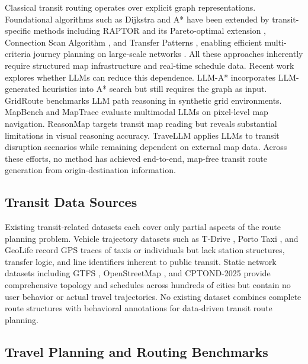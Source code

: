 \documentclass{llmxive}
\begin{document}
Classical transit routing operates over explicit graph representations. Foundational algorithms such as Dijkstra \cite{dijkstra2022note} and A* \cite{hart1968formal} have been extended by transit-specific methods including RAPTOR \cite{delling2015round} and its Pareto-optimal extension \cite{delling2019fast}, Connection Scan Algorithm \cite{dibbelt2018csa}, and Transfer Patterns \cite{bast2010transfer}, enabling efficient multi-criteria journey planning on large-scale networks \cite{bast2016route}. All these approaches inherently require structured map infrastructure and real-time schedule data. Recent work explores whether LLMs can reduce this dependence. LLM-A* \cite{meng2024llmastar} incorporates LLM-generated heuristics into A* search but still requires the graph as input. GridRoute \cite{lin2025gridroute} benchmarks LLM path reasoning in synthetic grid environments. MapBench \cite{xing2025mapbench} and MapTrace \cite{chen2025maptrace} evaluate multimodal LLMs on pixel-level map navigation. ReasonMap \cite{feng2025can} targets transit map reading but reveals substantial limitations in visual reasoning accuracy. TraveLLM \cite{fang2025travellm} applies LLMs to transit disruption scenarios while remaining dependent on external map data. Across these efforts, no method has achieved end-to-end, map-free transit route generation from origin-destination information.

\subsection{Transit Data Sources}

Existing transit-related datasets each cover only partial aspects of the route planning problem. Vehicle trajectory datasets such as T-Drive \cite{yuan2010tdrive}, Porto Taxi \cite{moreira2013porto}, and GeoLife \cite{zheng2010geolife} record GPS traces of taxis or individuals \cite{zheng2015trajectory} but lack station structures, transfer logic, and line identifiers inherent to public transit. Static network datasets including GTFS \cite{wong2013leveraging}, OpenStreetMap \cite{haklay2008openstreetmap}, and CPTOND-2025 \cite{wang2026china} provide comprehensive topology and schedules across hundreds of cities but contain no user behavior or actual travel trajectories. No existing dataset combines complete route structures with behavioral annotations for data-driven transit route planning.

\subsection{Travel Planning and Routing Benchmarks}
\end{document}
